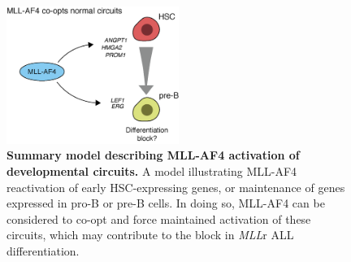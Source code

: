 \begin{figure}[htbp]
    \centering
    \includegraphics[width=0.5\textwidth,height=\textheight,keepaspectratio]{figures/models/ch4_model-ma4-coopt.png}
    \caption[{Summary model describing MLL-AF4 activation of developmental circuits.}]
    {\textbf{Summary model describing MLL-AF4 activation of developmental circuits.}
    A model illustrating MLL-AF4 reactivation of early HSC-expressing genes, or maintenance of genes expressed in pro-B or pre-B cells. In doing so, MLL-AF4 can be considered to co-opt and force maintained activation of these circuits, which may contribute to the block in \textit{MLL}r ALL differentiation.
    }
    \label{fig:ch4_model-ma4-coopt}
\end{figure}
